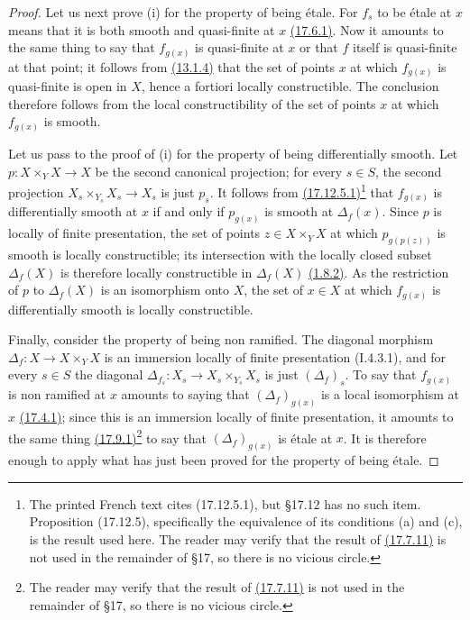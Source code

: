 \begin{proof}

Let us next prove (i) for the property of being \'etale.
For $f_s$ to be \'etale at $x$ means that it is both smooth and quasi-finite at $x$ {\hyperlink{ega4.c04.thm.17-6-1}{(17.6.1)}}.
Now it amounts to the same thing to say that $f_{g(x)}$ is quasi-finite at $x$ or that $f$ itself is quasi-finite at that point; it follows from {\hyperlink{ega4.c04.cor.13-1-4}{(13.1.4)}} that the set of points $x$ at which $f_{g(x)}$ is quasi-finite is open in $X$, hence a fortiori locally constructible.
The conclusion therefore follows from the local constructibility of the set of points $x$ at which $f_{g(x)}$ is smooth.

Let us pass to the proof of (i) for the property of being differentially smooth.
Let $p:X\times_Y X\to X$ be the second canonical projection; for every $s\in S$, the second projection $X_s\times_{Y_s}X_s\to X_s$ is just $p_s$.
It follows from {\hyperlink{ega4.c04.prop.17-12-5}{(17.12.5.1)}}\footnote{The printed French text cites (17.12.5.1), but \S17.12 has no such item. Proposition (17.12.5), specifically the equivalence of its conditions (a) and (c), is the result used here. The reader may verify that the result of {\hyperlink{ega4.c04.prop.17-7-11}{(17.7.11)}} is not used in the remainder of \S17, so there is no vicious circle.} that $f_{g(x)}$ is differentially smooth at $x$ if and only if $p_{g(x)}$ is smooth at $\Delta_f(x)$.
Since $p$ is locally of finite presentation, the set of points $z\in X\times_Y X$ at which $p_{g(p(z))}$ is smooth is locally constructible; its intersection with the locally closed subset $\Delta_f(X)$ is therefore locally constructible in $\Delta_f(X)$ {\hyperlink{ega4.c04.prop.1-8-2}{(1.8.2)}}.
As the restriction of $p$ to $\Delta_f(X)$ is an isomorphism onto $X$, the set of $x\in X$ at which $f_{g(x)}$ is differentially smooth is locally constructible.

Finally, consider the property of being non ramified.
The diagonal morphism $\Delta_f:X\to X\times_Y X$ is an immersion locally of finite presentation (I.4.3.1), and for every $s\in S$ the diagonal $\Delta_{f_s}:X_s\to X_s\times_{Y_s}X_s$ is just $(\Delta_f)_s$.
To say that $f_{g(x)}$ is non ramified at $x$ amounts to saying that $(\Delta_f)_{g(x)}$ is a local isomorphism at $x$ {\hyperlink{ega4.c04.thm.17-4-1}{(17.4.1)}}; since this is an immersion locally of finite presentation, it amounts to the same thing {\hyperlink{ega4.c04.thm.17-9-1}{(17.9.1)}}\footnote{The reader may verify that the result of {\hyperlink{ega4.c04.prop.17-7-11}{(17.7.11)}} is not used in the remainder of \S17, so there is no vicious circle.} to say that $(\Delta_f)_{g(x)}$ is \'etale at $x$.
It is therefore enough to apply what has just been proved for the property of being \'etale.
\end{proof}


